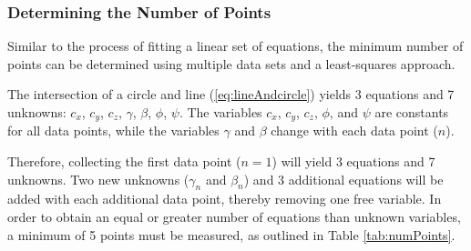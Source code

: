 \documentclass[12pt]{article}
\begin{document}
\subsubsection{Determining the Number of Points} \label{sec:minpoints}

Similar to the process of fitting a linear set of equations, the minimum number of points can be determined using multiple data sets and a least-squares approach.  

The intersection of a circle and line (\ref{eq:lineAndcircle}) yields 3 equations and 7 unknowns: $c_x$, $c_y$, $c_z$, $\gamma$, $\beta$, $\phi$, $\psi$.  The variables $c_x$, $c_y$, $c_z$, $\phi$, and $\psi$ are constants for all data points, while the variables $\gamma$ and $\beta$ change with each data point ($n$).
  
Therefore, collecting the first data point ($n = 1$) will yield 3 equations and 7 unknowns. Two new unknowns ($\gamma_n$ and $\beta_n$) and 3 additional equations will be added with each additional data point, thereby removing one free variable.  In order to obtain an equal or greater number of equations than unknown variables, a minimum of 5 points must be measured, as outlined in Table \ref{tab:numPoints}.
\end{document}
